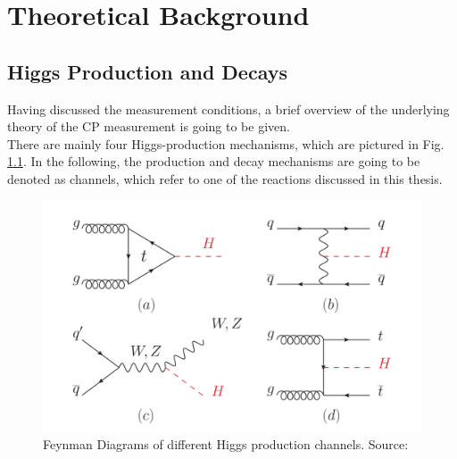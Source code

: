 
\chapter{Theoretical Background} %

\label{Chapter3} %

\section{Higgs Production and Decays}
Having discussed the measurement conditions, a brief overview of the underlying theory of the CP measurement is going to be given.\\
There are mainly four Higgs-production mechanisms, which are pictured in Fig. \ref{fig:Higgs_productions}. In the following, the production and decay mechanisms are going to be denoted as channels, which refer to one of the reactions discussed in this thesis.

\begin{figure}[h]
	\centering
	\includegraphics[width=0.7\linewidth]{Figures/Higgs-production_PDG_Huge_p183}
	\caption{Feynman Diagrams of different Higgs production channels. Source: \parencite{PDG_source}}
	\label{fig:Higgs_productions}
\end{figure}\\
